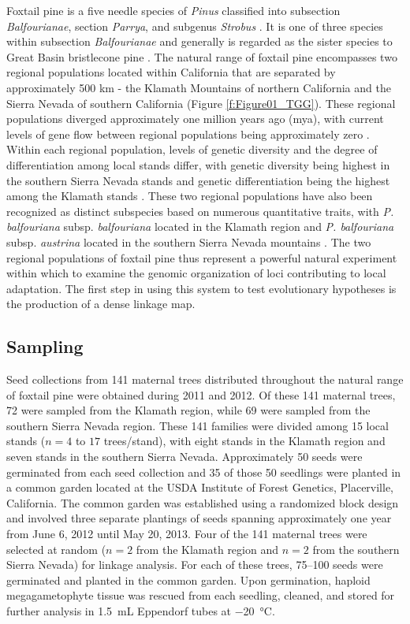 \documentclass[11pt]{article}
\begin{document}
Foxtail pine is a five needle species of \textit{Pinus} classified into 
subsection \textit{Balfourianae}, section \textit{Parrya}, and subgenus \textit{Strobus} 
\citep{Gernandt:2005}. It is one of three species within subsection \textit{Balfourianae} 
\citep{Bailey:1970} and generally is regarded as the sister species to Great Basin bristlecone pine \citep[\textit{P. longaeva} D. K. Bailey; see][] 
{Eckert:2006a}. The natural range of foxtail pine encompasses two 
regional populations located within California that are separated by approximately 500 km - 
the Klamath Mountains of northern California and the Sierra Nevada of southern California 
(Figure \ref{f:Figure01_TGG}). These regional populations diverged approximately one million years ago (mya), 
with current levels of gene flow between regional populations being approximately zero 
\citep{Eckert:2008}. Within each regional population, levels of genetic diversity and the 
degree of differentiation among local stands differ, with genetic diversity being highest in 
the southern Sierra Nevada stands and genetic differentiation being the highest among the 
Klamath stands \citep{Oline:2000, Eckert:2008}. These two regional populations
have also been recognized as distinct subspecies based on numerous quantitative traits, with \textit{P. balfouriana}
subsp. \textit{balfouriana} located in the Klamath region and \textit{P. balfouriana} subsp. \textit{austrina} located in the southern
Sierra Nevada mountains \citep{Mastrogiuseppe:1980}. The two regional populations of foxtail pine 
thus represent a powerful natural experiment within which to examine the genomic organization of loci contributing to local adaptation. The first step
in using this system to test evolutionary hypotheses is the production of a
dense linkage map.

\subsection*{Sampling}\label{ss:sampling}

Seed collections from 141 maternal trees distributed throughout the natural range 
of foxtail pine were obtained during 2011 and 2012. Of these 141 maternal trees, 72 were sampled from the 
Klamath region, while 69 were sampled from the southern Sierra Nevada region. These 141 families were
divided among 15 local stands ($n = 4$ to $17$ trees/stand), with eight stands in the Klamath region and seven stands in the southern Sierra Nevada.
Approximately 50 seeds were germinated from each seed collection and 35 of those 50 seedlings were planted in a 
common garden located at the USDA Institute of Forest Genetics, Placerville, California. The 
common garden was established using a randomized block design and involved three separate plantings of seeds spanning
approximately one year from June 6, 2012 until May 20, 2013. Four of the 141 maternal trees were selected 
at random ($n = 2$ from the Klamath region and $n = 2$ from the southern Sierra Nevada) for linkage analysis. 
For each of these trees, \SIrange{75}{100}{} seeds were germinated and planted in the common garden. 
Upon germination, haploid megagametophyte tissue was rescued from each seedling, cleaned, and stored for further 
analysis in \SI{1.5}{\mL} Eppendorf tubes at \SI{-20}{\celsius}.
\end{document}
